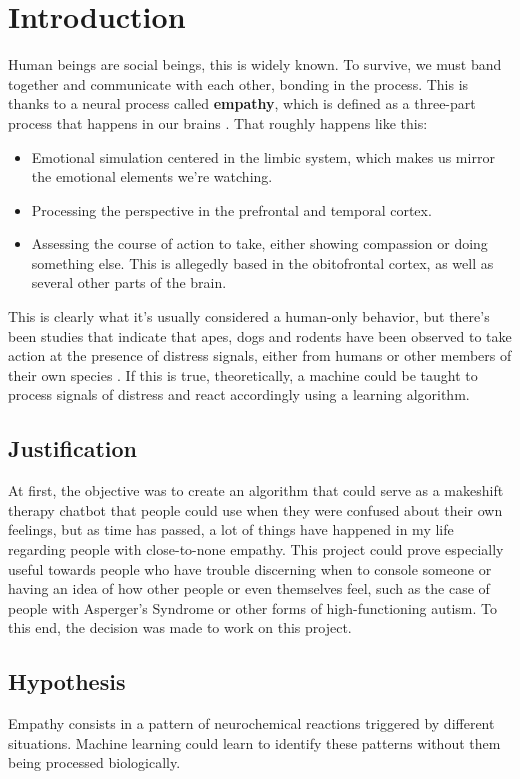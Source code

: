 \chapter{Introduction}
Human beings are social beings, this is widely known. To survive, we must band together and communicate with each other, bonding in the process. This is thanks to a neural process called \textbf{empathy}, which is defined as a three-part process that happens in our brains \citep{rf1}. That roughly happens like this:
\begin{itemize}
	\item Emotional simulation centered in the limbic system, which makes us mirror the emotional elements we're watching.
	\item Processing the perspective in the prefrontal and temporal cortex.
	\item Assessing the course of action to take, either showing compassion or doing something else. This is allegedly based in the obitofrontal cortex, as well as several other parts of the brain.
\end{itemize}
This is clearly what it's usually considered a human-only behavior, but there's been studies that indicate that apes, dogs and rodents have been observed to take action at the presence of distress signals, either from humans or other members of their own species \citep{rf2}.
If this is true, theoretically, a machine could be taught to process signals of distress and react accordingly using a learning algorithm.

\section{Justification}
At first, the objective was to create an algorithm that could serve as a makeshift therapy chatbot that people could use when they were confused about their own feelings, but as time has passed, a lot of things have happened in my life regarding people with close-to-none empathy.
This project could prove especially useful towards people who have trouble discerning when to console someone or having an idea of how other people or even themselves feel, such as the case of people with Asperger's Syndrome or other forms of high-functioning autism.
To this end, the decision was made to work on this project.

\section{Hypothesis}
Empathy consists in a pattern of neurochemical reactions triggered by different situations. Machine learning could learn to identify these patterns without them being processed biologically.

